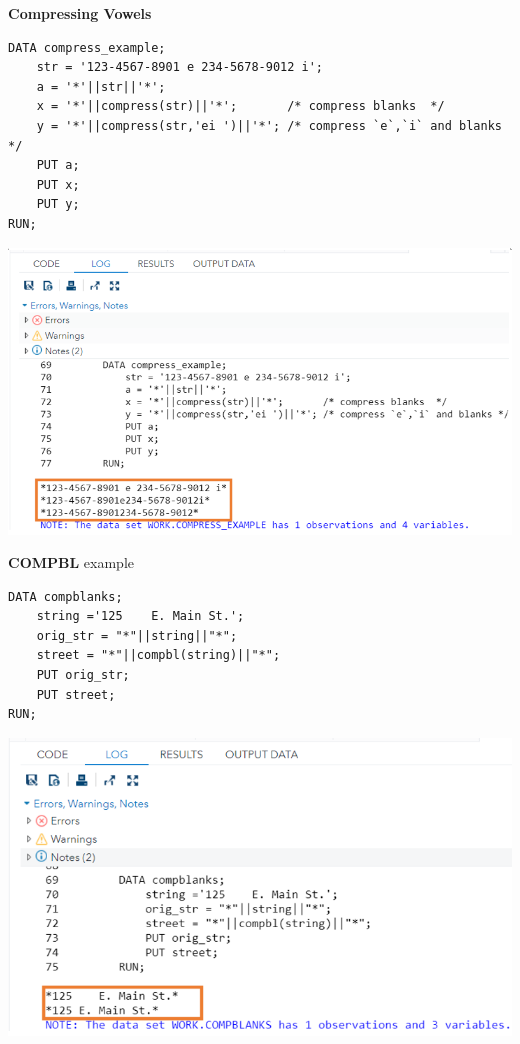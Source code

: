 \documentclass[
]{book}
\begin{document}
\textbf{Compressing Vowels}

\begin{verbatim}
DATA compress_example;
    str = '123-4567-8901 e 234-5678-9012 i';
    a = '*'||str||'*';
    x = '*'||compress(str)||'*';       /* compress blanks  */
    y = '*'||compress(str,'ei ')||'*'; /* compress `e`,`i` and blanks */
    PUT a;
    PUT x;
    PUT y;
RUN;
\end{verbatim}

\begin{center}\includegraphics[width=1\linewidth]{img10/w10-compressSpecificCharacter} \end{center}

\textbf{COMPBL} example

\begin{verbatim}
DATA compblanks;
    string ='125    E. Main St.';
    orig_str = "*"||string||"*";
    street = "*"||compbl(string)||"*";
    PUT orig_str;
    PUT street;
RUN;
\end{verbatim}

\begin{center}\includegraphics[width=1\linewidth]{img10/w10-compBL} \end{center}
\end{document}
